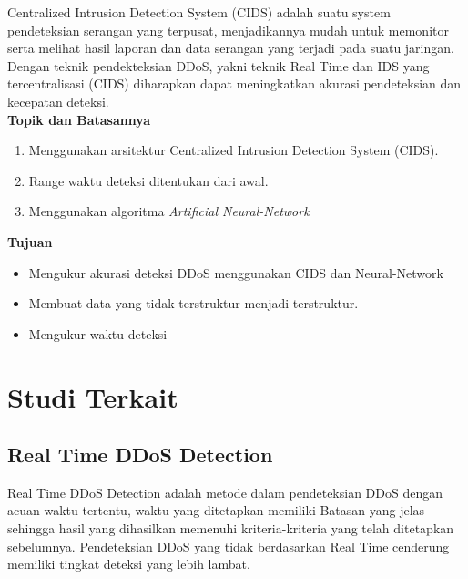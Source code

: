 Centralized Intrusion Detection System (CIDS) adalah suatu system pendeteksian serangan yang terpusat, menjadikannya mudah untuk memonitor serta melihat hasil laporan dan data serangan yang terjadi pada suatu jaringan. Dengan teknik pendekteksian DDoS, yakni teknik Real Time dan IDS yang tercentralisasi (CIDS) diharapkan dapat meningkatkan akurasi pendeteksian dan kecepatan deteksi.\\


\noindent\textbf{Topik dan Batasannya}

\begin{enumerate}
    \item Menggunakan arsitektur Centralized Intrusion Detection System (CIDS).
    \item Range waktu deteksi ditentukan dari awal.
    \item Menggunakan algoritma \textit{Artificial Neural-Network}
\end{enumerate}

\noindent\textbf{Tujuan}

\begin{itemize}
    
    \item Mengukur akurasi deteksi DDoS menggunakan CIDS dan Neural-Network
    \item Membuat data yang tidak terstruktur menjadi terstruktur.
    \item Mengukur waktu deteksi

\end{itemize}

\section{Studi Terkait}

\subsection{Real Time DDoS Detection}

Real Time DDoS Detection adalah metode dalam pendeteksian DDoS dengan acuan waktu tertentu, waktu yang ditetapkan memiliki Batasan yang jelas \cite{ddosfuzzy} sehingga hasil yang dihasilkan memenuhi kriteria-kriteria yang telah ditetapkan sebelumnya.
Pendeteksian DDoS yang tidak berdasarkan Real Time cenderung memiliki tingkat deteksi yang lebih lambat\cite{ddosfuzzy}.

